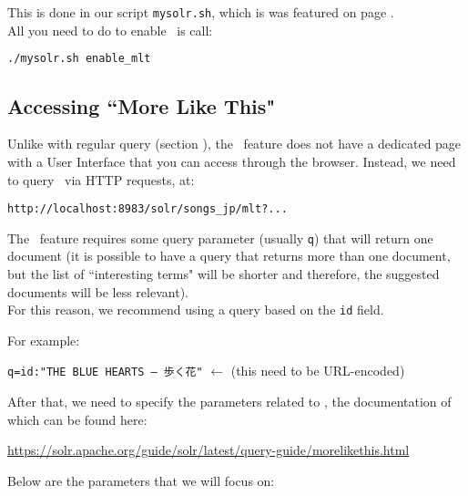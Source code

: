 This is done in our script \texttt{mysolr.sh}, which is was featured on page \pageref{mysolr.sh}. \\

All you need to do to enable \MLT\ is call:
\begin{lstlisting}[language=sh]
./mysolr.sh enable_mlt
\end{lstlisting}



\subsection{Accessing ``More Like This"}

Unlike with regular query (section \emph{}), the \MLT\ feature does not have a dedicated page with a User Interface that you can access through the browser. Instead, we need to query \MLT\ via HTTP requests, at:
\begin{center}
	\texttt{http://localhost:8983/solr/songs\_jp/mlt?...}
\end{center}

\bigskip

The \MLT\ feature requires some query parameter (usually \texttt{q}) that will return one document (it is possible to have a query that returns more than one document, but the list of ``interesting terms" will be shorter and therefore, the suggested documents will be less relevant). \\

For this reason, we recommend using a query based on the \texttt{id} field. 

For example:

\hfill	\texttt{q=id:"THE BLUE HEARTS -- 歩く花"} \hfill $\leftarrow$ (this need to be URL-encoded)

\bigskip
\bigskip

After that, we need to specify the parameters related to \MLT, the documentation of which can be found here:

\begin{center}
	\url{https://solr.apache.org/guide/solr/latest/query-guide/morelikethis.html}
\end{center}
\bigskip


Below are the parameters that we will focus on:

